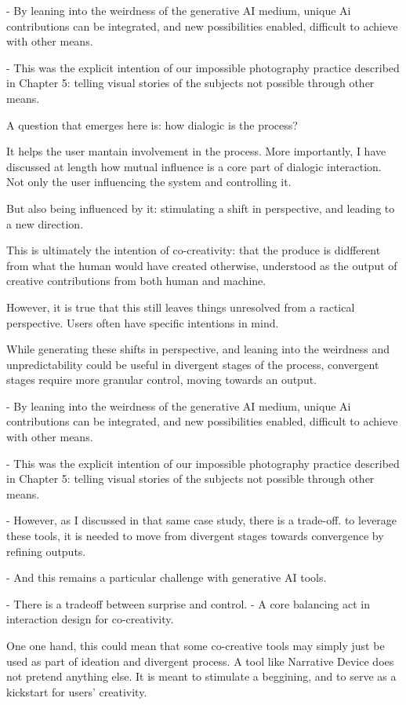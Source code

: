 - By leaning into the weirdness of the generative AI medium, unique Ai contributions can be integrated, and new possibilities enabled, difficult to achieve with other means. 

- This was the explicit intention of our impossible photography practice described in Chapter 5: telling visual stories of the subjects not possible through other means. 

A question that emerges here is: how dialogic is the process? 

It helps the user mantain involvement in the process. 
More importantly, I have discussed at length how mutual influence is a core part of dialogic interaction. Not only the user influencing the system and controlling it. 

But also being influenced by it: stimulating a shift in perspective, and leading to a new direction. 

This is ultimately the intention of co-creativity: that the produce is didfferent from what the human would have created otherwise, understood as the output of creative contributions from both human and machine. 

However, it is true that this still leaves things unresolved from a ractical perspective. Users often have specific intentions in mind. 

While generating these shifts in perspective, and leaning into the weirdness and unpredictability could be useful in divergent stages of the process, convergent stages require more granular control, moving towards an output. 

- By leaning into the weirdness of the generative AI medium, unique Ai contributions can be integrated, and new possibilities enabled, difficult to achieve with other means. 

- This was the explicit intention of our impossible photography practice described in Chapter 5: telling visual stories of the subjects not possible through other means. 

- However, as I discussed in that same case study, there is a trade-off. to leverage these tools, it is needed to move from divergent stages towards convergence by refining outputs. 

- And this remains a particular challenge with generative AI tools. 

- There is a tradeoff between surprise and control. 
- A core balancing act in interaction design for co-creativity. 

One one hand, this could mean that some co-creative tools may simply just be used as part of ideation and divergent process. A tool like Narrative Device does not pretend anything else. It is meant to stimulate a beggining, and to serve as a kickstart for users' creativity. 

